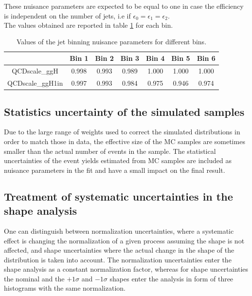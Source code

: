 These nuisance parameters are expected to be equal to one in case the efficiency is independent on the number of jets, i.e if $\epsilon_0 = \epsilon_1 = \epsilon_2$.\\
The values obtained are reported in table \ref{table:jet_binning_meas} for each \pth bin.

\begin{table}[h]
\caption{Values of the jet binning nuisance parameters for different \pth bins.}
\label{table:jet_binning_meas}
\begin{center}
\begin{tabular}{ccccccc}
& Bin 1 & Bin 2 & Bin 3 & Bin 4  & Bin 5 & Bin 6\\
\hline
QCDscale\_ggH  & 0.998  &   0.993  &   0.989  &   1.000  &   1.000   &  1.000 \\
QCDscale\_ggH1in &0.997   &  0.993  &   0.984  &   0.975 &    0.946 &    0.974  \\
\end{tabular}
\end{center}
\end{table}


\subsection{Statistics uncertainty of the simulated samples}

Due to the large range of weights used to correct the simulated distributions in order to
match those in data, the effective size of the MC samples are sometimes smaller than
the actual number of events in the sample.
The statistical uncertainties of the event yields estimated from MC samples
are included as nuisance parameters in the fit and have a small impact on the final result.

\subsection{Treatment of systematic uncertainties in the shape analysis}\label{sec:syst_treatment}

One can distinguish between normalization uncertainties, where a systematic
effect is changing the normalization of a given process assuming the shape is not affected, and
shape uncertainties where the actual change in the shape of the distribution is
taken into account. The normalization uncertainties enter the shape analysis as
a constant normalization factor, whereas for shape uncertainties the nominal and
the $+1\sigma$ and $-1\sigma$ shapes enter the analysis in form of three histograms
with the same normalization. 


